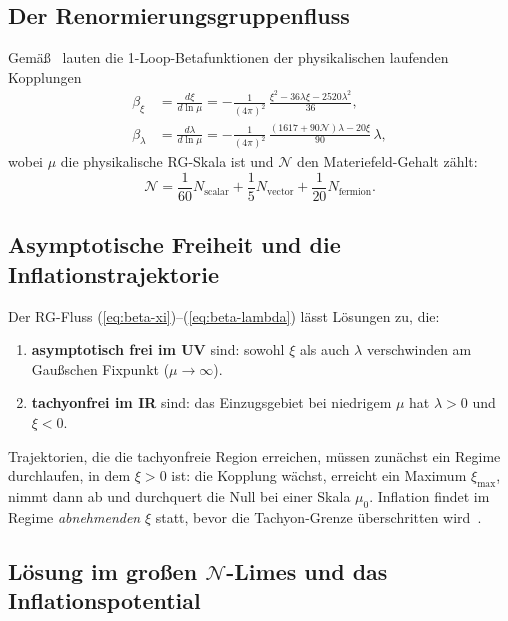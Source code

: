 \documentclass[aps,prd,twocolumn,superscriptaddress,nofootinbib]{revtex4-2}
\begin{document}
\subsection{Der Renormierungsgruppenfluss}

Gemäß~\cite{Buccio2024,LiuQuintinAfshordi2026} lauten die 1-Loop-Betafunktionen der physikalischen laufenden Kopplungen
\begin{align}
\beta_\xi &= \frac{d\xi}{d\ln\mu} = -\frac{1}{(4\pi)^2}\,\frac{\xi^2 - 36\lambda\xi - 2520\lambda^2}{36}, \label{eq:beta-xi}\\
\beta_\lambda &= \frac{d\lambda}{d\ln\mu} = -\frac{1}{(4\pi)^2}\,\frac{(1617 + 90\mathcal{N})\lambda - 20\xi}{90}\,\lambda, \label{eq:beta-lambda}
\end{align}
wobei $\mu$ die physikalische RG-Skala ist und $\mathcal{N}$ den Materiefeld-Gehalt zählt:
\begin{equation}
\mathcal{N} = \frac{1}{60}N_\mathrm{scalar} + \frac{1}{5}N_\mathrm{vector} + \frac{1}{20}N_\mathrm{fermion}.
\label{eq:matter-content}
\end{equation}

\subsection{Asymptotische Freiheit und die Inflationstrajektorie}

Der RG-Fluss (\ref{eq:beta-xi})--(\ref{eq:beta-lambda}) lässt Lösungen zu, die:
\begin{enumerate}
\item \textbf{asymptotisch frei im UV} sind: sowohl $\xi$ als auch $\lambda$ verschwinden am Gaußschen Fixpunkt ($\mu \to \infty$).
\item \textbf{tachyonfrei im IR} sind: das Einzugsgebiet bei niedrigem $\mu$ hat $\lambda > 0$ und $\xi < 0$.
\end{enumerate}

Trajektorien, die die tachyonfreie Region erreichen, müssen zunächst ein Regime durchlaufen, in dem $\xi > 0$ ist: die Kopplung wächst, erreicht ein Maximum $\xi_\mathrm{max}$, nimmt dann ab und durchquert die Null bei einer Skala $\mu_0$. Inflation findet im Regime \textit{abnehmenden} $\xi$ statt, bevor die Tachyon-Grenze überschritten wird~\cite{LiuQuintinAfshordi2026}.

\subsection{Lösung im großen $\mathcal{N}$-Limes und das Inflationspotential}
\end{document}
